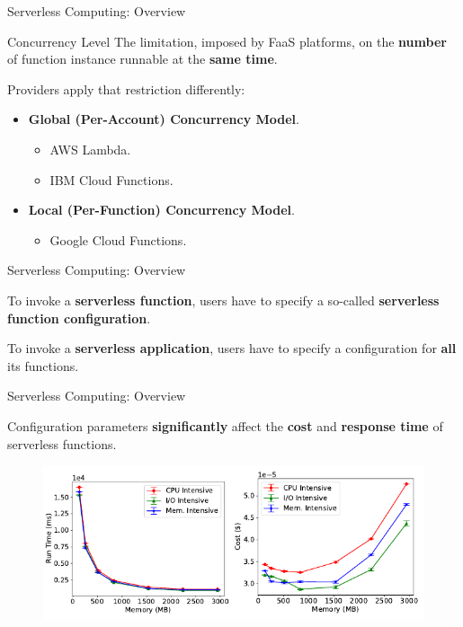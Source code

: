 \documentclass[13.5pt]{beamer}
\newcommand{\B}[1]{\textcolor{TorVergataColor}{\textbf{#1}}}
\begin{document}
\begin{frame}{Serverless Computing: Overview}
	
	\begin{block}{Concurrency Level}
		The limitation, imposed by FaaS platforms, on the \B{number} of function instance runnable at the \B{same time}.
	\end{block}
	\vspace{\baselineskip}
	Providers apply that restriction differently:
	\vspace{\baselineskip}
	\begin{itemize}
		\item \B{Global (Per-Account) Concurrency Model}.
		\begin{itemize}
			\item AWS Lambda. 
			\item IBM Cloud Functions.
		\end{itemize}
		\vspace{\baselineskip}
		\item \B{Local (Per-Function) Concurrency Model}.
		\begin{itemize}
			\item Google Cloud Functions.
		\end{itemize}
	\end{itemize}

\end{frame} 
\begin{frame}{Serverless Computing: Overview}
	
	\begin{block}{}
		\centering
		To invoke a \B{serverless function}, users have to specify a so-called \B{serverless function configuration}.
	\end{block}
	\vspace{\baselineskip}
	\begin{block}{}
		\centering
		To invoke a \B{serverless application}, users have to specify a configuration for \B{all} its functions.
	\end{block}
	
	
\end{frame} 
\begin{frame}{Serverless Computing: Overview}
	
	Configuration parameters \B{significantly} affect the \B{cost} and \B{response time} of serverless functions.
	\vspace{\baselineskip}
	\begin{figure}[h]
		\centering
		\includegraphics[width=\textwidth]{../Images/slideImage1.png}
	\end{figure}
	
\end{frame} 
\end{document}
